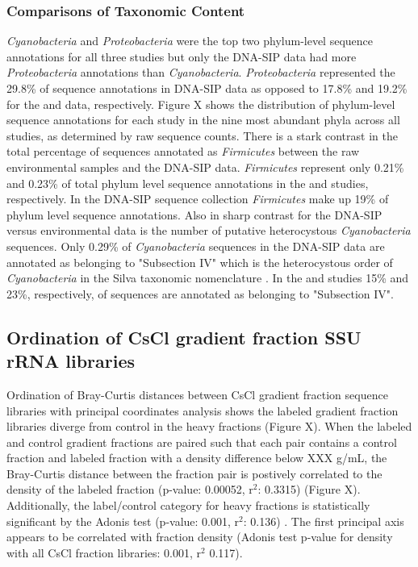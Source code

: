 \subsubsection{Comparisons of Taxonomic Content} 
\textit{Cyanobacteria} and \textit{Proteobacteria} were the top two phylum-level sequence annotations for all three studies but only the DNA-SIP data had more \textit{Proteobacteria} annotations than \textit{Cyanobacteria}. \textit{Proteobacteria} represented the 29.8\% of sequence annotations in DNA-SIP data as opposed to 17.8\% and 19.2\% for the \citet{Garcia_Pichel_2013} and \citet{Steven_2013} data, respectively. Figure X shows the distribution of phylum-level sequence annotations for each study in the nine most abundant  phyla across all studies, as determined by raw sequence counts. There is a stark contrast in the total percentage of sequences annotated as \textit{Firmicutes} between the raw environmental samples and the DNA-SIP data. \textit{Firmicutes} represent only 0.21\% and 0.23\% of total phylum level sequence annotations in the \citet{Steven_2013} and \citet{Garcia_Pichel_2013} studies, respectively. In the DNA-SIP sequence collection \textit{Firmicutes} make up 19\% of phylum level sequence annotations. Also in sharp contrast for the DNA-SIP versus environmental data is the number of putative heterocystous \textit{Cyanobacteria} sequences. Only 0.29\% of \textit{Cyanobacteria} sequences in the DNA-SIP data are annotated as belonging to "Subsection IV" which is the heterocystous order of \textit{Cyanobacteria} in the Silva taxonomic nomenclature \cite{17947321}. In the \citet{Steven_2013} and \citet{Garcia_Pichel_2013} studies 15\% and 23\%, respectively, of  sequences are annotated as belonging to "Subsection IV".  

\subsection{Ordination of CsCl gradient fraction SSU rRNA libraries}
Ordination of Bray-Curtis \cite{Bray_1957} distances between CsCl gradient fraction sequence libraries with principal coordinates analysis shows the labeled gradient fraction libraries diverge from control in the heavy fractions (Figure X). When the labeled and control gradient fractions are paired such that each pair contains a control fraction and labeled fraction with a density difference below XXX g/mL, the Bray-Curtis distance between the fraction pair is postively correlated to the density of the labeled fraction (p-value: 0.00052, r$^{2}$: 0.3315) (Figure X). Additionally, the label/control category for heavy fractions is statistically significant by the Adonis test (p-value: 0.001, r$^{2}$: 0.136) \cite{Anderson_2001}. The first principal axis appears to be correlated with fraction density (Adonis test p-value for density with all CsCl fraction libraries: 0.001, r$^{2}$ 0.117).

